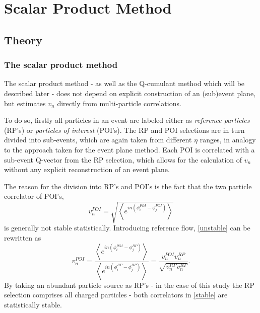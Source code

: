 \documentclass[a5paper]{book}
\numberwithin{equation}{subsection}
\begin{document}
\section{Scalar Product Method}
\label{SP}
\subsection{Theory}
\subsubsection{The scalar product method}
The scalar product method - as well as the Q-cumulant method which will be described later - does not depend on explicit construction of an (sub)event plane, but estimates $v_n$ directly from multi-particle correlations. 

To do so, firstly all particles in an event are labeled either as \emph{reference particles} (RP's) or \emph{particles of interest} (POI's). The RP and POI selections are in turn divided into sub-events, which are again taken from different $\eta$ ranges, in analogy to the approach taken for the event plane method. Each POI is correlated with a sub-event Q-vector from the RP selection, which allows for the calculation of $v_n$ without any explicit reconstruction of an event plane\cite{sp}. 

The reason for the division into RP's and POI's is the fact that the two particle correlator of POI's,
\begin{equation}\label{unstable}
	v_n^{POI} = \sqrt{ \left< e^{i n (\phi^{POI}_i - \phi^{POI}_j)} \right> }
\end{equation}
is generally not stable statistically. Introducing reference flow, \ref{unstable} can be rewritten as
\begin{equation}\label{stable}
	v_n^{POI} = \frac{ \left< e^{i n (\phi^{POI}_i - \phi^{RP}_j)} \right>}{\left< e^{i n (\phi^{RP}_i - \phi^{RP}_j)} \right>} = \frac{v_n^{POI} v_n^{RP} }{\sqrt{v_n^{RP} v_n^{RP}}}.
\end{equation}
By taking an abundant particle source as RP's - in the case of this study the RP selection comprises all charged particles - both correlators in \ref{stable} are statistically stable. 
\end{document}
